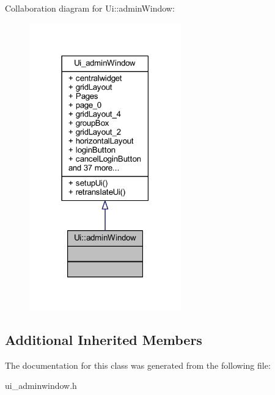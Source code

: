 Collaboration diagram for Ui\+:\+:admin\+Window\+:
\nopagebreak
\begin{figure}[H]
\begin{center}
\leavevmode
\includegraphics[width=186pt]{class_ui_1_1admin_window__coll__graph}
\end{center}
\end{figure}
\subsection*{Additional Inherited Members}


The documentation for this class was generated from the following file\+:\begin{DoxyCompactItemize}
\item 
ui\+\_\+adminwindow.\+h\end{DoxyCompactItemize}
